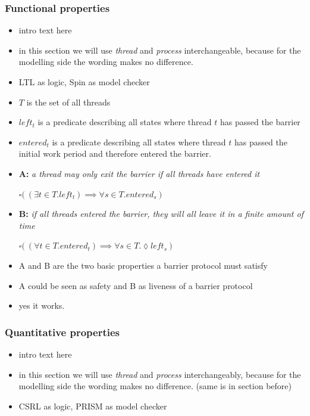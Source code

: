 \documentclass[a4paper, 10pt]{article}
\begin{document}
\subsubsection{Functional properties}
\label{sssec:analysis-modelchecking-functional-properties}
\begin{itemize}
	\item intro text here
	\item in this section we will use \emph{thread} and \emph{process} interchangeable, because for the modelling side the wording makes no difference.
	\item LTL as logic, Spin as model checker
	\item $T$ is the set of all threads
	\item $\mathit{left_t}$ is a predicate describing all states where thread $t$ has passed the barrier
	\item $entered_t$ is a predicate describing all states where thread $t$ has passed the initial work period and therefore entered the barrier.
	\item \textbf{A:} \emph{a thread may only exit the barrier if all threads have entered it}
		\begin{center}
			$\square \big( ~ ( \exists t \in T . \mathit{left_t} ) \implies \forall s \in T. \mathit{entered_s} ~ \big)$
		\end{center}
	\item \textbf{B:} \emph{if all threads entered the barrier, they will all leave it in a finite amount of time}
		\begin{center}
			$\square \big( ~(\forall t \in T . \mathit{entered_t} ) \implies \forall s \in T. \lozenge \mathit{left_s} ~ \big)$
		\end{center}
	\item A and B are the two basic properties a barrier protocol must satisfy
	\item A could be seen as safety and B as liveness of a barrier protocol
	\item yes it works.
\end{itemize}

\subsubsection{Quantitative properties}
\label{sssec:analysis-modelchecking-quantitative-properties}
\begin{itemize}
	\item intro text here
	\item in this section we will use \emph{thread} and \emph{process} interchangeably, because for the modelling side the wording makes no difference. (same is in section before)
	\item CSRL as logic, PRISM as model checker
\end{itemize}
\end{document}
